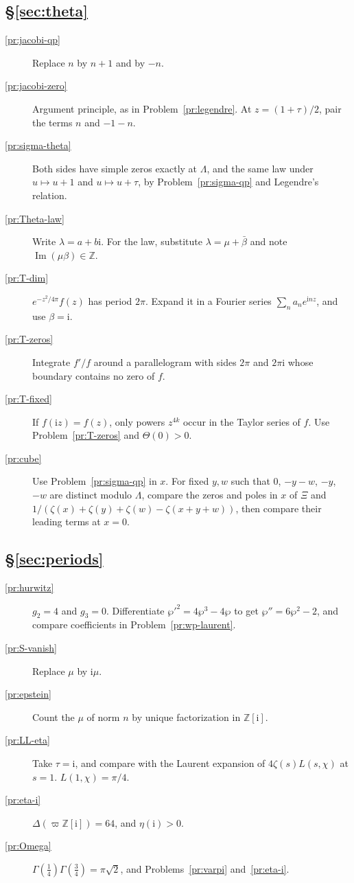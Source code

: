 \documentclass[reqno]{amsart}
\theoremstyle{definition}
\theoremstyle{plain}
\newcommand{\Z}{\mathbb{Z}}
\newcommand{\ii}{\mathrm{i}}
\begin{document}
\subsection*{\S\ref{sec:theta}}
\begin{description}
\item[\ref{pr:jacobi-qp}] Replace \(n\) by \(n + 1\) and by \(-n\).
\item[\ref{pr:jacobi-zero}] Argument principle, as in Problem~\ref{pr:legendre}.  At \(z = (1+\tau)/2\), pair the terms \(n\) and \(-1-n\).
\item[\ref{pr:sigma-theta}] Both sides have simple zeros exactly at \(\Lambda\), and the same law under \(u \mapsto u+1\) and \(u \mapsto u + \tau\), by Problem~\ref{pr:sigma-qp} and Legendre's relation.
\item[\ref{pr:Theta-law}] Write \(\lambda = a + b\ii\).  For the law, substitute \(\lambda = \mu + \bar\beta\) and note \(\operatorname{Im}(\mu\beta) \in \Z\).
\item[\ref{pr:T-dim}] \(e^{-z^2/4\pi} f(z)\) has period \(2\pi\).  Expand it in a Fourier series \(\sum_n a_n e^{\ii n z}\), and use \(\beta = \ii\).
\item[\ref{pr:T-zeros}] Integrate \(f'/f\) around a parallelogram with sides \(2\pi\) and \(2\pi\ii\) whose boundary contains no zero of \(f\).
\item[\ref{pr:T-fixed}] If \(f(\ii z) = f(z)\), only powers \(z^{4k}\) occur in the Taylor series of \(f\).  Use Problem~\ref{pr:T-zeros} and \(\Theta(0) > 0\).
\item[\ref{pr:cube}] Use Problem~\ref{pr:sigma-qp} in \(x\).  For fixed \(y,w\) such that \(0\), \(-y-w\), \(-y\), \(-w\) are distinct modulo \(\Lambda\), compare the zeros and poles in \(x\) of \(\Xi\) and \(1/(\zeta(x) + \zeta(y) + \zeta(w) - \zeta(x+y+w))\), then compare their leading terms at \(x=0\).
\end{description}

\subsection*{\S\ref{sec:periods}}
\begin{description}
\item[\ref{pr:hurwitz}] \(g_2 = 4\) and \(g_3 = 0\).  Differentiate \(\wp'^2 = 4\wp^3 - 4\wp\) to get \(\wp'' = 6\wp^2 - 2\), and compare coefficients in Problem~\ref{pr:wp-laurent}.
\item[\ref{pr:S-vanish}] Replace \(\mu\) by \(\ii\mu\).
\item[\ref{pr:epstein}] Count the \(\mu\) of norm \(n\) by unique factorization in \(\Z[\ii]\).
\item[\ref{pr:LL-eta}] Take \(\tau = \ii\), and compare with the Laurent expansion of \(4\zeta(s)L(s, \chi)\) at \(s = 1\).  \(L(1, \chi) = \pi/4\).
\item[\ref{pr:eta-i}] \(\Delta(\varpi\Z[\ii]) = 64\), and \(\eta(\ii) > 0\).
\item[\ref{pr:Omega}] \(\Gamma(\tfrac14)\Gamma(\tfrac34) = \pi\sqrt2\), and Problems~\ref{pr:varpi} and~\ref{pr:eta-i}.
\end{description}
\end{document}
